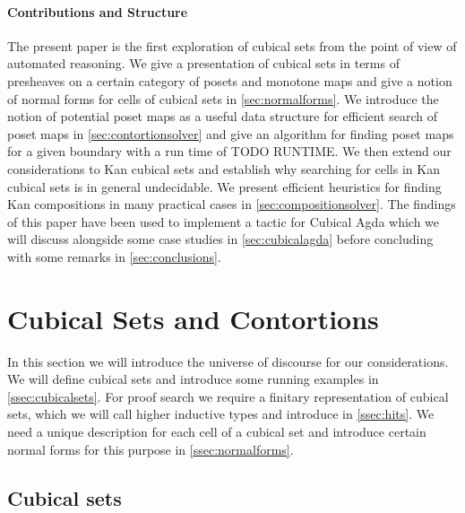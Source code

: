 \documentclass{llncs}
\begin{document}




\paragraph*{Contributions and Structure}

The present paper is the first exploration of cubical sets from the point of
view of automated reasoning. We give a presentation of cubical sets in terms of
presheaves on a certain category of posets and monotone maps and give a notion
of normal forms for cells of cubical sets in \autoref{sec:normalforms}. We
introduce the notion of potential poset maps as a useful data structure for
efficient search of poset maps in \autoref{sec:contortionsolver} and give an
algorithm for finding poset maps for a given boundary with a run time of TODO RUNTIME.
We then extend our considerations to Kan cubical sets and establish why searching for
cells in Kan cubical sets is in general undecidable. We present efficient heuristics for
finding Kan compositions in many practical cases in
\autoref{sec:compositionsolver}. The findings of this paper have been used to
implement a tactic for Cubical Agda which we will discuss alongside some case studies in
\autoref{sec:cubicalagda} before concluding with some remarks in
\autoref{sec:conclusions}.


\section{Cubical Sets and Contortions}
\label{sec:normalforms}

In this section we will introduce the universe of discourse for our
considerations. We will define cubical sets and introduce some running examples
in \autoref{ssec:cubicalsets}. For proof search we require a finitary
representation of cubical sets, which we will call higher inductive types and
introduce in \autoref{ssec:hits}. We need a unique description for each cell of
a cubical set and introduce certain normal forms for this purpose in
\autoref{ssec:normalforms}.

\subsection{Cubical sets}
\label{ssec:cubicalsets}
\end{document}
